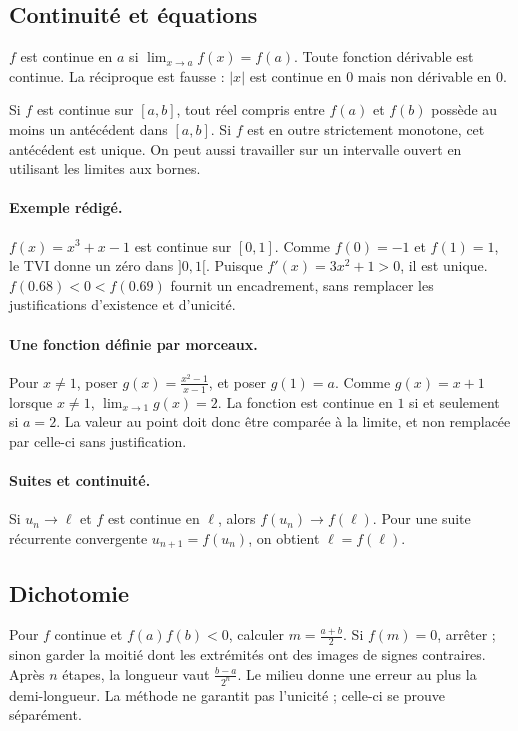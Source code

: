 \subsection{Continuité et équations}
$f$ est continue en $a$ si $\lim_{x\to a}f(x)=f(a)$. Toute fonction dérivable est continue. La réciproque est fausse : $|x|$ est continue en $0$ mais non dérivable en $0$.
\begin{keypoint}
Si $f$ est continue sur $[a,b]$, tout réel compris entre $f(a)$ et $f(b)$ possède au moins un antécédent dans $[a,b]$. Si $f$ est en outre strictement monotone, cet antécédent est unique. On peut aussi travailler sur un intervalle ouvert en utilisant les limites aux bornes.
\end{keypoint}
\paragraph{Exemple rédigé.} $f(x)=x^3+x-1$ est continue sur $[0,1]$. Comme $f(0)=-1$ et $f(1)=1$, le TVI donne un zéro dans $]0,1[$. Puisque $f'(x)=3x^2+1>0$, il est unique. $f(\num{0,68})<0<f(\num{0,69})$ fournit un encadrement, sans remplacer les justifications d'existence et d'unicité.
\paragraph{Une fonction définie par morceaux.} Pour $x\ne1$, poser $g(x)=\frac{x^2-1}{x-1}$, et poser $g(1)=a$. Comme $g(x)=x+1$ lorsque $x\ne1$, $\lim_{x\to1}g(x)=2$. La fonction est continue en $1$ si et seulement si $a=2$. La valeur au point doit donc être comparée à la limite, et non remplacée par celle-ci sans justification.
\paragraph{Suites et continuité.} Si $u_n\to\ell$ et $f$ est continue en $\ell$, alors $f(u_n)\to f(\ell)$. Pour une suite récurrente convergente $u_{n+1}=f(u_n)$, on obtient $\ell=f(\ell)$.
\subsection{Dichotomie}
Pour $f$ continue et $f(a)f(b)<0$, calculer $m=\frac{a+b}{2}$. Si $f(m)=0$, arrêter ; sinon garder la moitié dont les extrémités ont des images de signes contraires. Après $n$ étapes, la longueur vaut $\frac{b-a}{2^n}$. Le milieu donne une erreur au plus la demi-longueur. La méthode ne garantit pas l'unicité ; celle-ci se prouve séparément.


